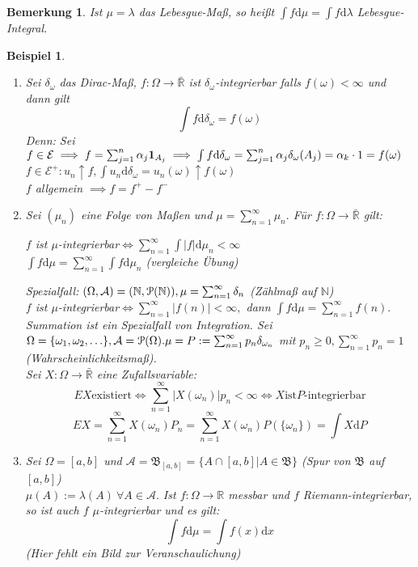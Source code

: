 \documentclass[a4paper,11pt]{book}
\newcommand{\R}{{\mathbb R}}
\newcommand{\N}{{\mathbb N}}
\newcommand{\ind}{\text{\bf{1}}}
\def\AA{ \mathcal{A} }
\def\PM{ \EuScript{P} }
\def\EE{ \mathcal{E} }
\def\BB{ \mathfrak{B} }
\def\folgt{\ensuremath{\implies}}
\def\equizu{\ensuremath{\iff}}
\def\d{\mbox{d}}
\newtheorem{Bsp}{Beispiel}[chapter]
\newtheorem*{BemON}{Bemerkung}
\theoremstyle{nonumberplain}
\begin{document}
\begin{BemON} Ist $\mu=\lambda$ das Lebesgue-Maß, so heißt $\int f\d \mu=\int f\d \lambda$ Lebesgue-Integral.
\end{BemON}

\begin{Bsp} \label{Bsp1.2}
\begin{enumerate}
\item[a)] Sei $\delta_\omega$ das Dirac-Maß, $f:\Omega\to\bar\R$ ist $\delta_\omega$-integrierbar falls $f(\omega)<\infty$ und dann gilt
$$\int f\d \delta_\omega=f(\omega)$$
Denn: Sei $f\in\EE\folgt f=\sum_{j=1}^n \alpha_j \ind_{A_j}\folgt \int f\d\delta_\omega=\sum_{j=1}^n\alpha_j\delta_\omega(A_j)=\alpha_k\cdot 1=f(\omega)$\\
$f\in\EE^+:u_n\uparrow f, \int u_n\d\delta_\omega=u_n(\omega)\uparrow f(\omega)$\\
$f$ allgemein $\folgt f=f^+-f^-$
\item[b)] Sei $(\mu_n)$ eine Folge von Maßen und $\mu=\sum_{n=1}^\infty\mu_n.$ Für $f:\Omega\to\bar\R$ gilt:
\begin{center}
$f$ ist $\mu$-integrierbar$\equizu\sum_{n=1}^\infty\int |f|\d\mu_n<\infty$\\
$\int f\d\mu = \sum_{n=1}^\infty\int f\d\mu_n$ (vergleiche Übung)
\end{center}
Spezialfall: $(\Omega, \AA)=(\N,\PM(\N)), \mu=\sum_{n=1}^\infty\delta_n$ (Zählmaß auf $\N$)\\
$f$ ist $\mu$-integrierbar$\equizu\sum_{n=1}^\infty|f(n)|<\infty,$ dann $\int f\d\mu=\sum_{n=1}^\infty f(n).$\\
Summation ist ein Spezialfall von Integration. 
Sei $\Omega=\{\omega_1, \omega_2, \ldots\}, \AA=\PM(\Omega). \mu=P:=\sum_{n=1}^\infty p_n\delta_{\omega_n}$ mit $p_n\ge 0, \sum_{n=1}^\infty p_n=1$ (Wahrscheinlichkeitsmaß).\\
Sei $X:\Omega\to\bar\R$ eine Zufallsvariable:
$$EX \text{existiert} \equizu \sum_{n=1}^\infty|X(\omega_n)|p_n<\infty\equizu X \text{ist} P\text{-integrierbar}$$
$$EX = \sum_{n=1}^\infty X(\omega_n)P_n=\sum_{n=1}^\infty X(\omega_n)P(\{\omega_n\})=\int X\d P$$
\item[c)] Sei $\Omega=[a,b]$ und $\AA=\BB_{[a,b]}=\{A\cap [a,b]|A\in\BB\}$ (Spur von $\BB$ auf $[a,b]$)\\
$\mu(A):=\lambda(A)\ \forall A\in\AA.$ Ist $f:\Omega\to\R$ messbar und $f$ Riemann-integrierbar, so ist auch $f$ $\mu$-integrierbar und es gilt:
$$\int f\d\mu=\int f(x)\d x$$
(Hier fehlt ein Bild zur Veranschaulichung)\\

\end{enumerate}
\end{Bsp}
\end{document}

